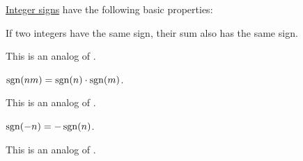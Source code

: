 \begin{proposition}\label{thm:def:integer_signum}
  \hyperref[def:integer_signum]{Integer signs} have the following basic properties:
  \begin{thmenum}
     If two integers have the same sign, their sum also has the same sign.

    This is an analog of .

     \( \operatorname{sgn}(nm) = \operatorname{sgn}(n) \cdot \operatorname{sgn}(m) \).

    This is an analog of .

     \( \operatorname{sgn}(-n) = -\operatorname{sgn}(n) \).

    This is an analog of .
  \end{thmenum}
\end{proposition}
